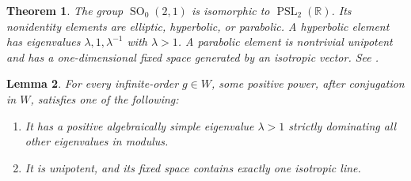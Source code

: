\documentclass[11pt,reqno]{amsart}
\newcommand{\R}{\mathbb{R}}
\theoremstyle{plain}
\newtheorem{theorem}{Theorem}[section]
\newtheorem{lemma}[theorem]{Lemma}
\theoremstyle{definition}
\theoremstyle{remark}
\numberwithin{equation}{section}
\begin{document}
\begin{theorem}\label{thm:lorentz-classification}
The group $\operatorname{SO}_0(2,1)$ is isomorphic to $\operatorname{PSL}_2(\R)$. Its nonidentity elements are elliptic, hyperbolic, or parabolic. A hyperbolic element has eigenvalues $\lambda,1,\lambda^{-1}$ with $\lambda>1$. A parabolic element is nontrivial unipotent and has a one-dimensional fixed space generated by an isotropic vector. See \cite{Beardon1983}.
\end{theorem}

\begin{lemma}\label{lem:23-spectral-alternative}
For every infinite-order $g\in W$, some positive power, after conjugation in $W$, satisfies one of the following:
\begin{enumerate}
\item It has a positive algebraically simple eigenvalue $\lambda>1$ strictly dominating all other eigenvalues in modulus.
\item It is unipotent, and its fixed space contains exactly one isotropic line.
\end{enumerate}
\end{lemma}
\end{document}

